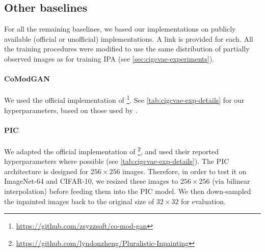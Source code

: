 \subsection{Other baselines}
For all the remaining baselines, we based our implementations on publicly
available (official or unofficial) implementations. A link is provided for each.
All the training procedures were modified to use the same distribution of
partially observed images as for training IPA (see \cref{sec:cigcvae-experiments}).

\paragraph{CoModGAN} We used the official implementation of
\citet{zhao2021large}\footnote{\url{https://github.com/zsyzzsoft/co-mod-gan}}.
See \cref{tab:cigcvae-exp-details} for our hyperparameters, based on those used by
\citet{zhao2021large}.

\paragraph{PIC} We adapted the official implementation of
\citet{zheng2019pluralistic}\footnote{\url{https://github.com/lyndonzheng/Pluralistic-Inpainting}},
and used their reported hyperparameters where possible (see
\cref{tab:cigcvae-exp-details}). The PIC architecture is designed for $256 \times 256$
images. Therefore, in order to test it on ImageNet-64 and CIFAR-10, we resized
these images to $256 \times 256$ (via bilinear interpolation) before feeding
them into the PIC model. We then down-sampled the inpainted images back to the
original size of $32 \times 32$ for evaluation.


